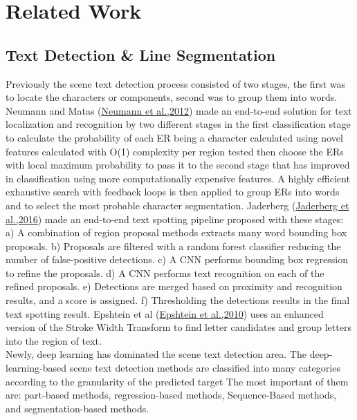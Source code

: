 \section{Related Work}
\label{related work Section}
\subsection{Text Detection \& Line Segmentation}
Previously the scene text detection process consisted of two stages, the first was to locate the characters or components, second was to group them into words. Neumann and Matas (\hyperref[Neumann2012]{Neumann et al.,2012}) made an end-to-end solution for text localization and recognition by two different stages in the first classification stage to calculate the  probability of each
ER being a character calculated using novel features calculated with O(1) complexity per region tested then choose the ERs with local maximum probability to pass it to the second stage that has improved in classification using more computationally expensive features. A highly efficient exhaustive search with feedback loops is then applied to group ERs into words and to select the most probable character segmentation. Jaderberg (\hyperref[Jaderberg2016]{Jaderberg et al.,2016}) made an end-to-end text spotting pipeline proposed with these stages: a) A combination of region proposal methods extracts many word bounding box proposals. b) Proposals are filtered with a random forest classifier reducing the number of false-positive detections. c) A CNN performs bounding box regression to refine the proposals. d) A CNN performs text recognition on each of the refined proposals. e) Detections are merged based on proximity and recognition results, and a score is assigned. f) Thresholding the detections results in the final text spotting result. Epshtein et al (\hyperref[Epshtein2010]{Epshtein et al.,2010}) uses an enhanced version of the Stroke Width Transform to find letter candidates and group letters into the region of text.\\
Newly, deep learning has dominated the scene text detection area. The deep-learning-based scene text detection methods are classified into many categories according to the granularity of the predicted target The most important of them are: part-based methods, regression-based methods, Sequence-Based methods, and segmentation-based methods.\\
